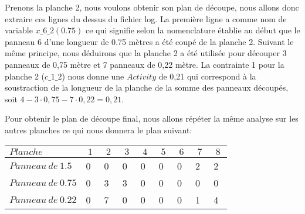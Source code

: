 \documentclass{article}[A4]
\begin{document}
Prenons la planche 2, nous voulons obtenir son plan de découpe, nous 
allons donc extraire ces lignes du dessus du fichier log. La première 
ligne a comme nom de variable \texttt{$x\_6\_2(0.75)$} ce qui signifie 
selon la nomenclature établie au début que le panneau 6 d'une longueur 
de 0.75 mètres a été coupé de la planche 2. Suivant le même principe,
nous déduirons que la planche 2 a été utilisée pour découper 3 
panneaux de 0,75 mètre et 7 panneaux de 0,22 mètre. La contrainte 1 
pour la planche 2 (\texttt{$c\_1\_2$}) nous donne une $Activity$ de 0,21 
qui correspond à la soustraction de la longueur de la planche de la 
somme des panneaux découpés, soit $4 - 3 \cdot 0,75 - 7 \cdot 0,22 = 
0,21$.

Pour obtenir le plan de découpe final, nous allons répéter la même 
analyse sur les autres planches ce qui nous donnera le plan suivant:
\begin{center}
	\begin{tabular} {| l | l | l | l | l | l | l | l | l |}
		\hline
		$Planche$				&$\ 1 \ $	&$\ 2 \ $	&$\ 3 \ $	&$\ 4 \ $ 	&$\ 5 \ $	&$\ 6 \ $	&$\ 7 \ $	&$\ 8 \ $	\\
		\hline
		$ Panneau\ de\ 1.5 $	&	0		&	0		& 	0		&	0		&	0		&	0		& 	2		&  	2		\\
		\hline
		$ Panneau\ de\ 0.75$	& 	0		&	3 		& 	3		&	0		&	0		&	0		& 	0		&  	0		\\
		\hline
		$ Panneau\ de\ 0.22$ 	& 	0		&	7		& 	0		&	0		&	0		&	0		& 	1		&  	4		\\
		\hline
	\end{tabular}
\end{center}
\end{document}
